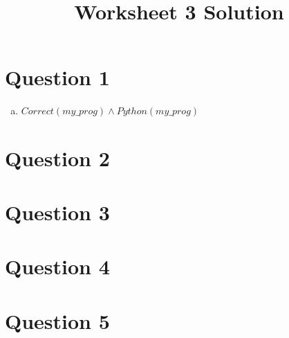 \documentclass[12pt]{article}
\begin{document}
\title{Worksheet 3 Solution}
\maketitle

\section*{Question 1}

\begin{enumerate}[a)]
    \item
        $Correct(my\_prog) \land Python(my\_prog)$
\end{enumerate}

\section*{Question 2}

\section*{Question 3}

\section*{Question 4}

\section*{Question 5}
\end{document}
